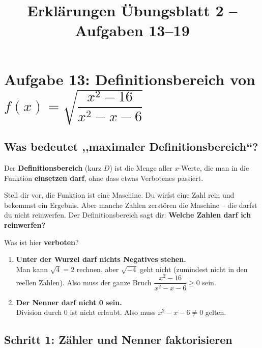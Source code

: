 \documentclass[12pt,a4paper]{article}
\title{Erkl\"arungen \"Ubungsblatt 2 -- Aufgaben 13--19}
\author{}
\date{}
\begin{document}
\maketitle
\tableofcontents
\newpage

\section{Aufgabe 13: Definitionsbereich von $f(x)=\sqrt{\dfrac{x^2-16}{x^2-x-6}}$}

\subsection{Was bedeutet ,,maximaler Definitionsbereich``?}

\begin{merkbox}
Der \textbf{Definitionsbereich} (kurz $D$) ist die Menge aller $x$-Werte, die man in die Funktion \textbf{einsetzen darf}, ohne dass etwas Verbotenes passiert.
\end{merkbox}

\begin{analogie}
Stell dir vor, die Funktion ist eine Maschine. Du wirfst eine Zahl rein und bekommst ein Ergebnis. Aber manche Zahlen zerst\"oren die Maschine -- die darfst du nicht reinwerfen. Der Definitionsbereich sagt dir: \textbf{Welche Zahlen darf ich reinwerfen?}
\end{analogie}

Was ist hier \textbf{verboten}?

\begin{enumerate}
  \item \textbf{Unter der Wurzel darf nichts Negatives stehen.}\\
        Man kann $\sqrt{4}=2$ rechnen, aber $\sqrt{-4}$ geht nicht (zumindest nicht in den reellen Zahlen). Also muss der ganze Bruch $\dfrac{x^2-16}{x^2-x-6} \ge 0$ sein.
  \item \textbf{Der Nenner darf nicht 0 sein.}\\
        Division durch 0 ist nicht erlaubt. Also muss $x^2 - x - 6 \ne 0$ gelten.
\end{enumerate}

\subsection{Schritt 1: Z\"ahler und Nenner faktorisieren}
\end{document}
